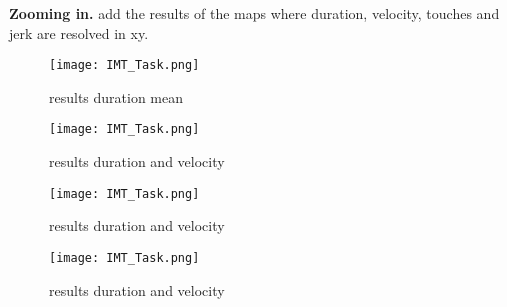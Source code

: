 
\indent \textbf{Zooming in.} add the results of the maps where duration, velocity, touches and jerk are resolved in xy.

\begin{figure}[h]
\centering
\texttt{[image: IMT\_Task.png]}
\vspace{0pt}
\caption{results duration mean}
\label{results_dur_mean}
\end{figure}

\begin{figure}[h]
\centering
\texttt{[image: IMT\_Task.png]}
\vspace{0pt}
\caption{results duration and velocity}
\label{results_dur_effect}
\end{figure}

\begin{figure}[h]
\centering
\texttt{[image: IMT\_Task.png]}
\vspace{0pt}
\caption{results duration and velocity}
\label{results_touches_mean}
\end{figure}

\begin{figure}[h]
\centering
\texttt{[image: IMT\_Task.png]}
\vspace{0pt}
\caption{results duration and velocity}
\label{results_touches_effect}
\end{figure}

\begin{comment}

interpretation histogram binning:
how many samples fall within 1 bin -> samples/srate = duration in seconds per bin, also must consider step size when calculating

what does imagesc return after that? interpretation should stay the same and be sensible -> returns just the gaussian smoothing over the peak that is the histogram count

interpreting regression:
with an increase in presence x more seconds where spent at point xy
for easy interpretation we introduce the reasoning: participants with a higher reported presence spent 1.8 seconds longer at point (4,5 located in the outer corner of the first turn)

interpreting regression:
with an increase in presence participants moved slower closer to the wall and faster in when in the center of the maze path.

for easy interpretation we introduce the reasoning: for each 1 point increase in reported presence, participants walked x km per hour faster when at the center of the maze path and x kmh slower when getting closer to the walls.

\end{comment}
